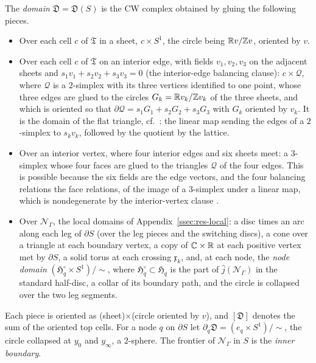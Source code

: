 \begin{definition}\label{def:domain}
The \emph{domain} $\mathfrak D=\mathfrak D(S)$ is the CW complex obtained by gluing the following pieces.
\begin{itemize}
\item Over each cell $c$ of $\mathfrak T$ in a sheet, $c\times S^1$, the circle being $\mathbb R v/\mathbb Z v$, oriented by $v$.
\item Over each cell $c$ of $\mathfrak T$ on an interior edge, with fields $v_1,v_2,v_3$ on the adjacent sheets and
$s_1v_1+s_2v_2+s_3v_3=0$ (the interior-edge balancing clause): $c\times\mathcal Q$, where $\mathcal Q$ is a $2$-simplex with its three vertices identified
to one point, whose three edges are glued to the circles $G_k=\mathbb R v_k/\mathbb Z v_k$ of the three sheets, and which is oriented so that
$\partial\mathcal Q=s_1G_1+s_2G_2+s_3G_3$ with $G_k$ oriented by $v_k$. It is the domain of the flat triangle, cf.\
\cite[Lemma~7.7]{CBM}: the linear map sending the edges of a $2$-simplex to $s_kv_k$, followed by the quotient by the lattice.
\item Over an interior vertex, where four interior edges and six sheets meet: a $3$-simplex whose four faces are glued to the
triangles $\mathcal Q$ of the four edges. This is possible because the six fields are the edge vectors, and the four balancing
relations the face relations, of the image of a $3$-simplex under a linear map, which is nondegenerate by the interior-vertex clause
\cite[\S7.7, Step~4]{CBM}.
\item Over $\mathcal N_\Gamma$, the local domains of Appendix~\ref{ssec:res-local}: a disc times an arc along each leg of
$\partial S$ (over the leg pieces and the switching discs), a cone over a triangle at each boundary vertex, a copy of
$\mathbb C\times\mathbb R$ at each positive vertex met by $\partial S$, a solid torus at each crossing $\mathfrak x_k$, and, at each node, the
\emph{node domain} $(\mathfrak H^\circ_q\times S^1)/\!\sim$, where $\mathfrak H^\circ_q\subset\mathfrak H_q$ is the part of
$\hat j(\mathcal N_\Gamma)$ in the standard half-disc, a collar of its boundary path, and the circle is collapsed over the two
leg segments.
\end{itemize}
Each piece is oriented as (sheet)$\times$(circle oriented by $v$), and $[\mathfrak D]$ denotes the sum of the oriented top
cells. For a node $q$ on $\partial S$ let $\partial_q\mathfrak D=(e_q\times S^1)/\!\sim$, the circle collapsed at $y_0$ and
$y_\infty$, a $2$-sphere. The frontier of $\mathcal N_\Gamma$ in $S$ is the \emph{inner boundary}.
\end{definition}

